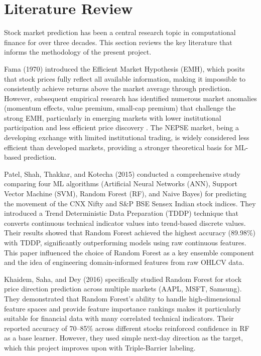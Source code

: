 \documentclass[12pt, a4paper]{report}
\begin{document}
	
	\chapter{Literature Review}
	Stock market prediction has been a central research topic in computational finance for over three decades. This section reviews the key literature that informs the methodology of the present project.
	
	Fama (1970) \cite{fama1970} introduced the Efficient Market Hypothesis (EMH), which posits that stock prices fully reflect all available information, making it impossible to consistently achieve returns above the market average through prediction. However, subsequent empirical research has identified numerous market anomalies (momentum effects, value premium, small-cap premium) that challenge the strong EMH, particularly in emerging markets with lower institutional participation and less efficient price discovery \cite{malkiel2003}. The NEPSE market, being a developing exchange with limited institutional trading, is widely considered less efficient than developed markets, providing a stronger theoretical basis for ML-based prediction.
	
	Patel, Shah, Thakkar, and Kotecha (2015) \cite{patel2015} conducted a comprehensive study comparing four ML algorithms (Artificial Neural Networks (ANN), Support Vector Machine (SVM), Random Forest (RF), and Naive Bayes) for predicting the movement of the CNX Nifty and S\&P BSE Sensex Indian stock indices. They introduced a Trend Deterministic Data Preparation (TDDP) technique that converts continuous technical indicator values into trend-based discrete values. Their results showed that Random Forest achieved the highest accuracy (89.98\%) with TDDP, significantly outperforming models using raw continuous features. This paper influenced the choice of Random Forest as a key ensemble component and the idea of engineering domain-informed features from raw OHLCV data.
	
	Khaidem, Saha, and Dey (2016) \cite{khaidem2016} specifically studied Random Forest for stock price direction prediction across multiple markets (AAPL, MSFT, Samsung). They demonstrated that Random Forest's ability to handle high-dimensional feature spaces and provide feature importance rankings makes it particularly suitable for financial data with many correlated technical indicators. Their reported accuracy of 70--85\% across different stocks reinforced confidence in RF as a base learner. However, they used simple next-day direction as the target, which this project improves upon with Triple-Barrier labeling.
	
\end{document}
